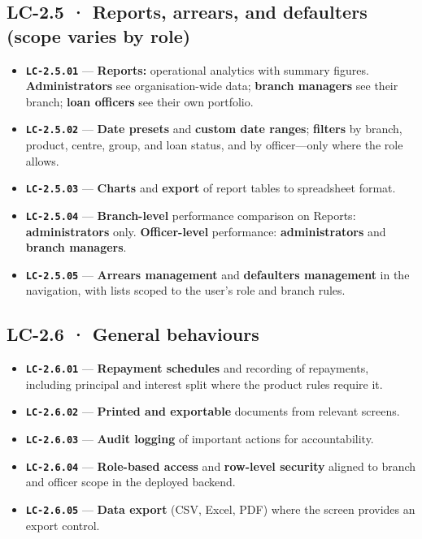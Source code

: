 \documentclass[11pt,a4paper]{article}
\newcommand{\LC}[1]{\textbf{\texttt{#1}}}
\begin{document}
\subsection*{LC-2.5 · Reports, arrears, and defaulters (scope varies by role)}
\begin{itemize}
  \item \LC{LC-2.5.01} --- \textbf{Reports:} operational analytics with summary figures. \textbf{Administrators} see organisation-wide data; \textbf{branch managers} see their branch; \textbf{loan officers} see their own portfolio.
  \item \LC{LC-2.5.02} --- \textbf{Date presets} and \textbf{custom date ranges}; \textbf{filters} by branch, product, centre, group, and loan status, and by officer---only where the role allows.
  \item \LC{LC-2.5.03} --- \textbf{Charts} and \textbf{export} of report tables to spreadsheet format.
  \item \LC{LC-2.5.04} --- \textbf{Branch-level} performance comparison on Reports: \textbf{administrators} only. \textbf{Officer-level} performance: \textbf{administrators} and \textbf{branch managers}.
  \item \LC{LC-2.5.05} --- \textbf{Arrears management} and \textbf{defaulters management} in the navigation, with lists scoped to the user's role and branch rules.
\end{itemize}

\subsection*{LC-2.6 · General behaviours}
\begin{itemize}
  \item \LC{LC-2.6.01} --- \textbf{Repayment schedules} and recording of repayments, including principal and interest split where the product rules require it.
  \item \LC{LC-2.6.02} --- \textbf{Printed and exportable} documents from relevant screens.
  \item \LC{LC-2.6.03} --- \textbf{Audit logging} of important actions for accountability.
  \item \LC{LC-2.6.04} --- \textbf{Role-based access} and \textbf{row-level security} aligned to branch and officer scope in the deployed backend.
  \item \LC{LC-2.6.05} --- \textbf{Data export} (CSV, Excel, PDF) where the screen provides an export control.
\end{itemize}
\end{document}
